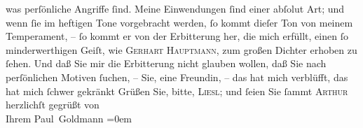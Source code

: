 \begin{ledgroupsized}[t]{13cm}
               was perſönliche Angriffe ſind. Meine Einwendungen ſind einer abſolut \label{T_L03535-1v}\label{T_L03535-1h} Art; und wenn ſie im heftigen Tone vorgebracht
               werden, ſo kommt dieſer Ton von meinem Temperament, – ſo kommt er von der Erbitterung
               her, die mich erfüllt, einen ſo minderwerthigen Geiſt, wie \textsc{Gerhart Hauptmann}, zum großen Dichter erhoben zu ſehen. Und daß Sie mir die Erbitterung nicht
               glauben wollen, daß Sie nach perſönlichen Motiven ſuchen, – Sie, eine Freundin, – das
               hat mich verblüfft, das hat mich ſchwer gekränkt{\dotsfive}\pend
           \pstart
           Grüßen Sie, bitte, \textsc{Liesl}; und ſeien Sie ſammt \textsc{Arthur} herzlichſt gegrüßt von {\\[\baselineskip]}Ihrem \spacefill\mbox{Paul Goldmann}\pend
           \leftskip=0em{}
         
         \endnumbering{}\end{ledgroupsized}\begin{anhang}\end{anhang}\newcommand{\dateiname}{L03535}\newcommand{\titel}{Paul Goldmann an Olga Gussmann, 15. 11. [1901]}\newcommand{\editorInnen}{Martin Anton Müller und Laura Untner}
      